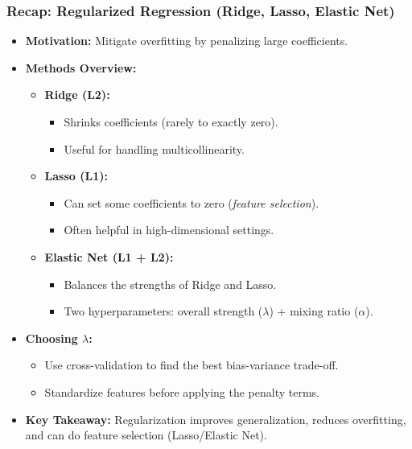 \documentclass[aspectratio=169]{beamer}
\begin{document}
\begin{frame}
    \frametitle{Recap: Regularized Regression (Ridge, Lasso, Elastic Net)}
    \begin{itemize}
        \item \textbf{Motivation:} Mitigate overfitting by penalizing large coefficients.
        \item \textbf{Methods Overview:}
            \begin{itemize}
                \item \textbf{Ridge (L2):}
                    \begin{itemize}
                        \item Shrinks coefficients (rarely to exactly zero).
                        \item Useful for handling multicollinearity.
                    \end{itemize}
                \item \textbf{Lasso (L1):}
                    \begin{itemize}
                        \item Can set some coefficients to zero (\emph{feature selection}).
                        \item Often helpful in high-dimensional settings.
                    \end{itemize}
                \item \textbf{Elastic Net (L1 + L2):}
                    \begin{itemize}
                        \item Balances the strengths of Ridge and Lasso.
                        \item Two hyperparameters: overall strength (\(\lambda\)) + mixing ratio (\(\alpha\)).
                    \end{itemize}
            \end{itemize}
        \item \textbf{Choosing \(\lambda\):}
            \begin{itemize}
                \item Use cross-validation to find the best bias-variance trade-off.
                \item Standardize features before applying the penalty terms.
            \end{itemize}
        \item \textbf{Key Takeaway:}
            Regularization improves generalization, reduces overfitting, and can do feature selection (Lasso/Elastic Net).
    \end{itemize}
\end{frame}
\end{document}
